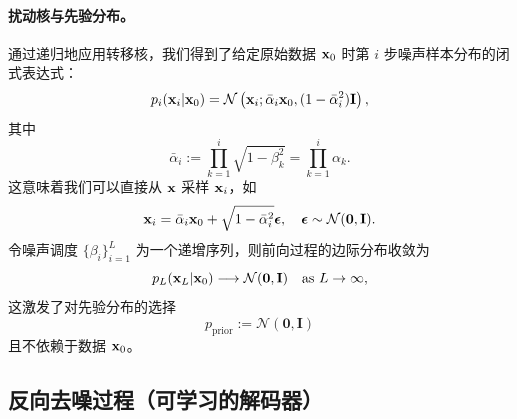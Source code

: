 \paragraph{扰动核与先验分布。}
通过递归地应用转移核，我们得到了给定原始数据 ${\mathbf{x}}_0$ 时第 $i$ 步噪声样本分布的闭式表达式：
\[
p_i({\mathbf{x}}_i|{\mathbf{x}}_0) = \mathcal{N}\left({\mathbf{x}}_i; \bar{\alpha}_i {\mathbf{x}}_0, (1 - \bar{\alpha}_i^2) {\mathbf{I}} \right),
\]
其中
\[
\bar{\alpha}_i := \prod_{k=1}^i \sqrt{1-\beta_k^2} = \prod_{k=1}^i \alpha_k.
\]
这意味着我们可以直接从 ${\mathbf{x}}$ 采样 ${\mathbf{x}}_i$，如
\begin{align}\label{eq:ddpm-forward}
    {\mathbf{x}}_i = \bar{\alpha}_i {\mathbf{x}}_0 + \sqrt{1-\bar{\alpha}_i^2}   \bm{\epsilon}, \quad \bm{\epsilon} \sim \mathcal{N}(\bm{0}, {\mathbf{I}}).
\end{align}
令噪声调度 $ \{\beta_i\}_{i=1}^L $ 为一个递增序列，则前向过程的边际分布收敛为
\[
p_L(\mathbf{x}_L | {\mathbf{x}}_0) \longrightarrow \mathcal{N}(\mathbf{0}, \mathbf{I}) \quad \text{as } L \to \infty,
\]
这激发了对先验分布的选择
\[
p_{\text{prior}} := \mathcal{N}(\mathbf{0}, \mathbf{I})
\]
且不依赖于数据 ${\mathbf{x}}_0$。


\subsection{反向去噪过程（可学习的解码器）}


